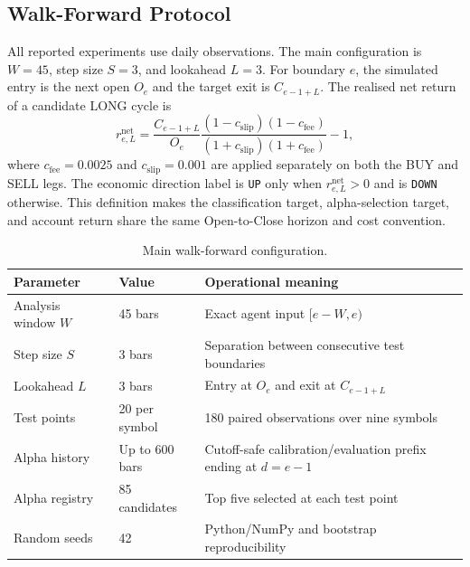 \subsection{Walk-Forward Protocol}

All reported experiments use daily observations. The main configuration is $W=45$, step size $S=3$, and lookahead $L=3$. For boundary $e$, the simulated entry is the next open $O_e$ and the target exit is $C_{e-1+L}$. The realised net return of a candidate LONG cycle is
\begin{equation}
 r^{\mathrm{net}}_{e,L}
 =\frac{C_{e-1+L}}{O_e}
  \frac{(1-c_{\mathrm{slip}})(1-c_{\mathrm{fee}})}
       {(1+c_{\mathrm{slip}})(1+c_{\mathrm{fee}})}-1,
 \label{eq:execution_return_setup}
\end{equation}
where $c_{\mathrm{fee}}=0.0025$ and $c_{\mathrm{slip}}=0.001$ are applied separately on both the BUY and SELL legs. The economic direction label is \texttt{UP} only when $r^{\mathrm{net}}_{e,L}>0$ and is \texttt{DOWN} otherwise. This definition makes the classification target, alpha-selection target, and account return share the same Open-to-Close horizon and cost convention.

\begin{table}[H]
\centering
\caption{Main walk-forward configuration.}
\label{tab:backtest_hyperparameters}
\renewcommand{\arraystretch}{1.18}
\begin{tabularx}{\textwidth}{|l|l|X|}
\hline
\textbf{Parameter} & \textbf{Value} & \textbf{Operational meaning} \\
\hline
Analysis window $W$ & 45 bars & Exact agent input $[e-W,e)$ \\
\hline
Step size $S$ & 3 bars & Separation between consecutive test boundaries \\
\hline
Lookahead $L$ & 3 bars & Entry at $O_e$ and exit at $C_{e-1+L}$ \\
\hline
Test points & 20 per symbol & 180 paired observations over nine symbols \\
\hline
Alpha history & Up to 600 bars & Cutoff-safe calibration/evaluation prefix ending at $d=e-1$ \\
\hline
Alpha registry & 85 candidates & Top five selected at each test point \\
\hline
Random seeds & 42 & Python/NumPy and bootstrap reproducibility \\
\hline
\end{tabularx}
\end{table}

